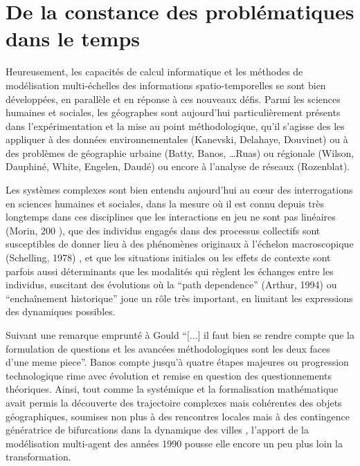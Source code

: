 \section{De la constance des problématiques dans le temps}

Heureusement, les capacités de calcul informatique et les méthodes de modélisation multi-échelles des informations spatio-temporelles se sont bien développées, en parallèle et en réponse à ces nouveaux défis. Parmi les sciences humaines et sociales, les géographes sont aujourd'hui particulièrement présents dans l’expérimentation et la mise au point méthodologique, qu’il s’agisse des les appliquer à des données environnementales (Kanevski, Delahaye, Douvinet) ou à des problèmes de géographie urbaine (Batty, Banos, …Ruas) ou régionale (Wilson, Dauphiné, White, Engelen, Daudé) ou encore à l’analyse de réseaux (Rozenblat). 

Les systèmes complexes sont bien entendu aujourd'hui au cœur des interrogations en sciences humaines et sociales, dans la mesure où il est connu depuis très longtemps dans ces disciplines que les interactions en jeu ne sont pas linéaires   (Morin, 200 ), que des individus engagés dans des processus collectifs sont susceptibles de donner lieu à des phénomènes originaux à l’échelon macroscopique (Schelling, 1978) , et que les situations initiales ou les effets de contexte sont parfois aussi déterminants que les modalités qui règlent les échanges entre les individus, suscitant des évolutions où la \foreignquote{english}{path dependence}  (Arthur, 1994) ou \enquote{enchaînement historique} joue un rôle très important, en limitant les expressions des dynamiques possibles.

Suivant une remarque emprunté à Gould \autocite[31]{Gould2004} \enquote{[...] il faut bien se rendre compte que la formulation de questions et les avancées méthodologiques sont les deux faces d'une meme piece}. Banos \autocite{Banos2013} compte jusqu'à quatre étapes majeures ou progression technologique rime avec évolution et remise en question des questionnements théoriques. Ainsi, tout comme la systémique et la formalisation mathématique avait permis la découverte des trajectoire complexes mais cohérentes des objets géographiques, soumises non plus à des rencontres locales mais à des contingence génératrice de bifurcations dans la dynamique des villes \autocite[137]{Pumain2002}, l'apport de la modélisation multi-agent des années 1990 pousse elle encore un peu plus loin la transformation. \autocite{Sanders2007}

